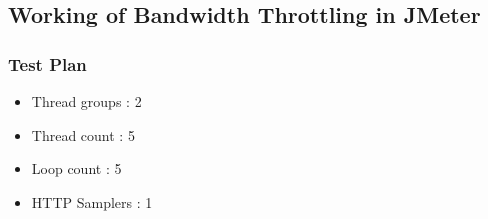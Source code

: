 \documentclass[12pt]{beamer}
\begin{document}
\subsection{Working of Bandwidth Throttling in JMeter}
\begin{frame}[c]
\frametitle{Test Plan}
\begin{minipage}[t]{0.48\linewidth}
  \begin{itemize}
   \item Thread groups : 2\\
   \item Thread count : 5  \\
   \item Loop count  : 5 \\
   \item HTTP Samplers : 1 \\
  \end{itemize}
  \end{minipage}\hfill
  \begin{minipage}[t]{0.48\linewidth}
    \vspace{-1cm}

    \end{minipage}

\end{frame}
\end{document}
